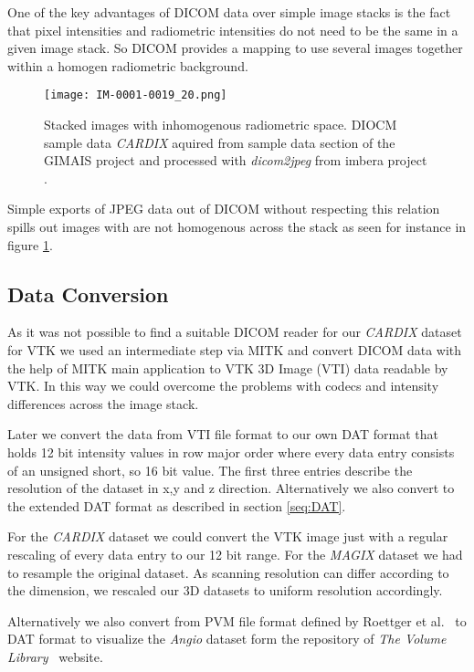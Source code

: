 One of the key advantages of DICOM data over simple image stacks is the fact that pixel intensities and radiometric intensities do not need to be the same in a given image stack. So DICOM provides a mapping to use several images together within a homogen radiometric background.


\begin{figure}[h]
	\centering
	\texttt{[image: IM-0001-0019\_20.png]} \\
	\caption{Stacked images with inhomogenous radiometric space. DIOCM sample data \emph{CARDIX} \cite{gimias_sampledata_2018} aquired from sample data section of the GIMAIS project \cite{gimias_2018} and processed with \emph{dicom2jpeg} from imbera project \cite{imebra_dicom_sdk_2018}.}
	\label{fig:IM-0001-0019_20}
\end{figure}

Simple exports of JPEG data out of DICOM without respecting this relation spills out images with are not homogenous across the stack as seen for instance in figure \ref{fig:IM-0001-0019_20}.


\subsection{Data Conversion}

As it was not possible to find a suitable DICOM reader for our \emph{CARDIX} dataset \cite{gimias_sampledata_2018} for VTK we used an intermediate step via MITK and convert DICOM data with the help of MITK main application to VTK 3D Image (VTI) data readable by VTK.
In this way we could overcome the problems with codecs and intensity differences across the image stack.

Later we convert the data from VTI file format to our own DAT format that holds 12 bit intensity values in row major order where every data entry consists of an unsigned short, so 16 bit value. The first three entries describe the resolution of the dataset in x,y and z direction.
Alternatively we also convert to the extended DAT format as described in section \ref{seq:DAT}.

For the \emph{CARDIX} dataset we could convert the VTK image just with a regular rescaling of every data entry to our 12 bit range. For the \emph{MAGIX} dataset we had to resample the original dataset. As scanning resolution can differ according to the dimension, we rescaled our 3D datasets to uniform resolution accordingly. 

Alternatively we also convert from PVM file format defined by Roettger et al.~\cite{roettger_PVM_2018} to DAT format to visualize the \emph{Angio} dataset form the repository of \emph{The Volume Library}~\cite{roettger_VOL_2018} website. 


